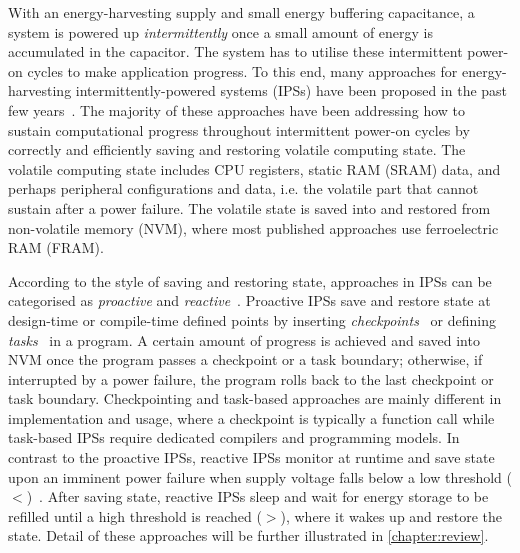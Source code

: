 With an energy-harvesting supply and small energy buffering capacitance, a system is powered up \textit{intermittently} once a small amount of energy is accumulated in the capacitor. 
The system has to utilise these intermittent power-on cycles to make application progress. 
To this end, many approaches for energy-harvesting intermittently-powered systems (IPSs) have been proposed in the past few years~\cite{lucia2017intermittent, shafik2018realpower, doi:10.1098/rsta.2019.0158}. 
The majority of these approaches have been addressing how to sustain computational progress throughout intermittent power-on cycles by correctly and efficiently saving and restoring volatile computing state. 
The volatile computing state includes CPU registers, static RAM (SRAM) data, and perhaps peripheral configurations and data, i.e. the volatile part that cannot sustain after a power failure. 
The volatile state is saved into and restored from non-volatile memory (NVM), where most published approaches use ferroelectric RAM (FRAM). 

According to the style of saving and restoring state, approaches in IPSs can be categorised as \textit{proactive} and \textit{reactive}~\cite{doi:10.1098/rsta.2019.0158}. 
Proactive IPSs save and restore state at design-time or compile-time defined points by inserting \textit{checkpoints}~\cite{ransford2012mementos, bhatti2017harvos, maeng2018adaptive, singla2019flexicheck} or defining \textit{tasks}~\cite{lucia2015simpler, colin2016chain, maeng2017alpaca, 10.1145/3360285} in a program. 
A certain amount of progress is achieved and saved into NVM once the program passes a checkpoint or a task boundary; otherwise, if interrupted by a power failure, the program rolls back to the last checkpoint or task boundary. 
Checkpointing and task-based approaches are mainly different in implementation and usage, where a checkpoint is typically a function call while task-based IPSs require dedicated compilers and programming models. 
In contrast to the proactive IPSs, reactive IPSs monitor  at runtime and save state upon an imminent power failure when supply voltage falls below a low threshold ($<$)~\cite{jayakumar2014quickrecall, balsamo2015hibernus, balsamo2016hibernus++, kang2018homerun}. 
After saving state, reactive IPSs sleep and wait for energy storage to be refilled until a high threshold is reached ($>$), where it wakes up and restore the state. 
Detail of these approaches will be further illustrated in \cref{chapter:review}.

